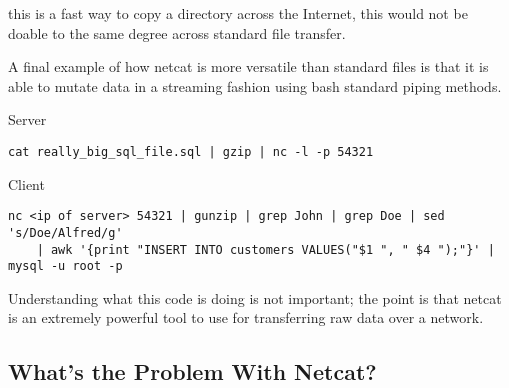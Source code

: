 \documentclass{scrartcl}
\begin{document}
this is a fast way to copy a directory across the Internet, this would not
be doable to the same degree across standard file transfer.

A final example of how netcat is more versatile than standard files is that
it is able to mutate data in a streaming fashion using bash standard piping
methods.


Server
\begin{verbatim}
cat really_big_sql_file.sql | gzip | nc -l -p 54321
\end{verbatim}

Client
\begin{verbatim}
nc <ip of server> 54321 | gunzip | grep John | grep Doe | sed 's/Doe/Alfred/g'
	| awk '{print "INSERT INTO customers VALUES("$1 ", " $4 ");"}' | mysql -u root -p
\end{verbatim}

Understanding what this code is doing is not important; the point is that netcat
is an extremely powerful tool to use for transferring raw data over a network.

\subsection{What's the Problem With Netcat?}
\end{document}
